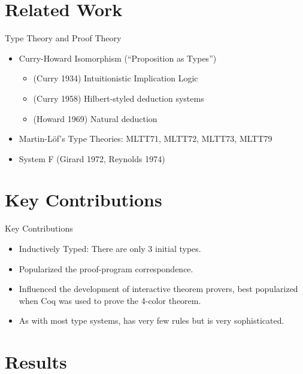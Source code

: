 \documentclass{beamer}
\theoremstyle{plain}
\begin{document}
\section{Related Work}
\begin{frame}{Type Theory and Proof Theory}
  \begin{itemize}
    \item Curry-Howard Isomorphism (``Proposition as Types'')
    \begin{itemize}
      \item (Curry 1934) Intuitionistic Implication Logic
      \item (Curry 1958) Hilbert-styled deduction systems
      \item (Howard 1969) Natural deduction
    \end{itemize}
    \item Martin-Löf's Type Theories: MLTT71, MLTT72, MLTT73, MLTT79
    \item System F (Girard 1972, Reynolds 1974)
  \end{itemize}
\end{frame}

\section{Key Contributions}

\begin{frame}{Key Contributions}
\begin{itemize}
  \item Inductively Typed: There are only 3 initial types.
  \item Popularized the proof-program correspondence.
  \item Influenced the development of interactive theorem provers, best
  popularized when Coq was used to prove the 4-color theorem.
  \item As with most type systems, has very few rules but is very sophisticated.
\end{itemize}
\end{frame}

\section{Results}
\end{document}
